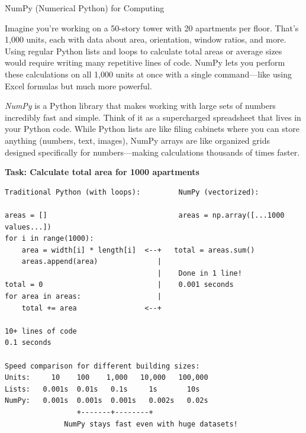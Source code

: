 
\h{NumPy (Numerical Python) for Computing}

Imagine you're working on a 50-story tower with 20 apartments per floor. That's 1,000 units, each with data about area, orientation, window ratios, and more. Using regular Python lists and loops to calculate total areas or average sizes would require writing many repetitive lines of code. NumPy lets you perform these calculations on all 1,000 units at once with a single command---like using Excel formulas but much more powerful.

\emph{NumPy} is a Python library that makes working with large sets of numbers incredibly fast and simple. Think of it as a supercharged spreadsheet that lives in your Python code. While Python lists are like filing cabinets where you can store anything (numbers, text, images), NumPy arrays are like organized grids designed specifically for numbers---making calculations thousands of times faster.

\begin{tcolorbox}[
    title=NumPy vs Traditional Approach,
    colframe=black,
    colback = white,
    arc=2mm
]
\textbf{Task: Calculate total area for 1000 apartments}
\begin{lstlisting}[basicstyle=\ttfamily\footnotesize,breaklines=true,columns=fullflexible,keepspaces=true,xleftmargin=0pt]
Traditional Python (with loops):         NumPy (vectorized):
                                         
areas = []                               areas = np.array([...1000 values...])
for i in range(1000):    
    area = width[i] * length[i]  <--+   total = areas.sum()  
    areas.append(area)              |    
                                    |    Done in 1 line!
total = 0                           |    0.001 seconds
for area in areas:                  |    
    total += area                <--+    
                                         
10+ lines of code                       
0.1 seconds                             

Speed comparison for different building sizes:
Units:     10    100    1,000   10,000   100,000
Lists:   0.001s  0.01s   0.1s     1s       10s
NumPy:   0.001s  0.001s  0.001s   0.002s   0.02s
                 +-------+--------+
              NumPy stays fast even with huge datasets!

\end{lstlisting}
\end{tcolorbox}

